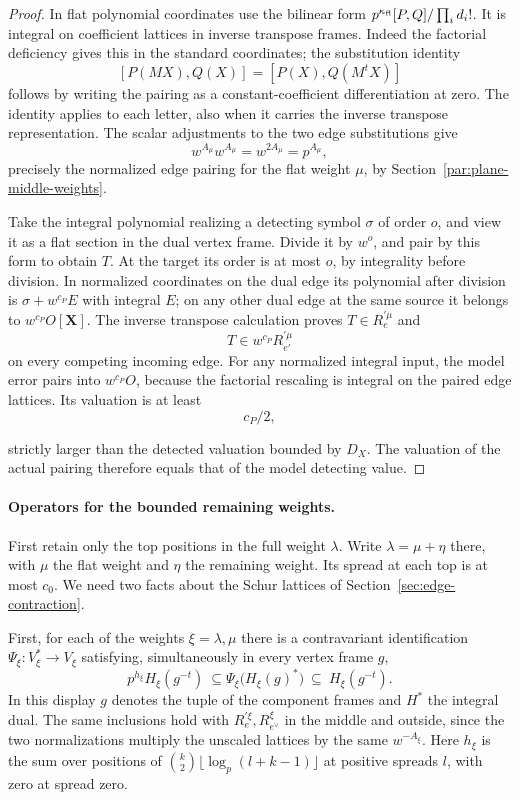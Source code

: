 \begin{proof}
In flat polynomial coordinates use the bilinear form
\(p^{\kappa_{\rm fl}}[P,Q]/\prod_i d_i!\).
It is integral on coefficient lattices in inverse transpose
frames. Indeed the factorial deficiency gives this in the
standard coordinates; the substitution identity
\[
 [P(MX),Q(X)]=[P(X),Q(M^tX)]
\]
follows by writing the
pairing as a constant-coefficient differentiation at zero.
The identity applies to each letter, also when it carries the
inverse transpose representation. The scalar adjustments to the two edge substitutions give 
\[
 w^{A_\mu}w^{A_\mu}=w^{2A_\mu}=p^{A_\mu},
\]
 precisely
the normalized edge pairing for the flat weight \(\mu\), by
Section~\ref{par:plane-middle-weights}.

Take the integral polynomial realizing a detecting symbol
\(\sigma\) of order \(o\), and view it as a flat section in the
dual vertex frame. Divide it by \(w^o\), and pair by this form to
obtain \(T\). At the target its order is at most \(o\), by
integrality before division. In normalized coordinates on the
dual edge its polynomial after division is \(\sigma+w^{c_P}E\)
with integral \(E\); on any other dual edge at the same source
it belongs to \(w^{c_P}O[\mathbf X]\). The inverse transpose
calculation proves \(T\in R_e^{\prime\mu}\) and
\[
 T\in w^{c_P}R_{e'}^{\prime\mu}
\]
on every competing incoming
edge. For any normalized integral input, the model error pairs into
\(w^{c_P}O\), because the factorial rescaling is integral on
the paired edge lattices. Its valuation is at least
\[
 c_P/2,
\]

strictly larger than the detected valuation bounded by \(D_X\).
The valuation of the actual pairing therefore equals that
of the model detecting value.

\end{proof}

\paragraph{Operators for the bounded remaining weights.}
\label{par:plane-rho}
First retain only the top positions in the full weight \(\lambda\).
Write \(\lambda=\mu+\eta\) there, with \(\mu\) the flat weight
and \(\eta\) the remaining weight. Its spread at each top is at
most \(c_0\). We need two facts about the Schur lattices
of Section~\ref{sec:edge-contraction}.

First, for each of the weights \(\xi=\lambda,\mu\) there is a
contravariant identification \(\Psi_\xi:V_\xi^*\longrightarrow
V_\xi\) satisfying, simultaneously in every vertex frame \(g\),
\[
 p^{h_\xi} H_\xi(g^{-t})\ \subseteq \Psi_\xi\bigl(H_\xi(g)^*\bigr)\ \subseteq\ H_\xi(g^{-t}).
\]
In this display \(g\) denotes the tuple of the component frames
and \(H^*\) the integral dual. The same inclusions hold with
\(R_e^{\prime\xi},R_{e^\vee}^\xi\) in the middle and outside,
since the two normalizations multiply the unscaled lattices by
the same \(w^{-A_\xi}\).
Here \(h_\xi\) is the sum over positions of
\(\binom k2\lfloor\log_p(l+k-1)\rfloor\) at positive spreads
\(l\), with zero at spread zero.

